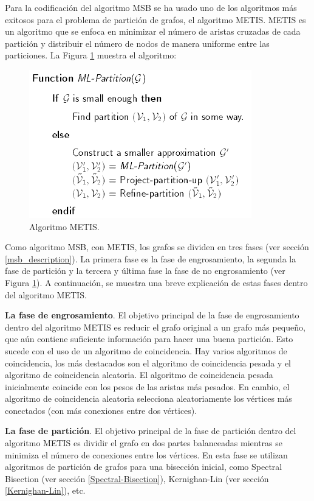 Para la codificación del algoritmo MSB se ha usado uno de los algoritmos más exitosos para el problema de partición de grafos, el algoritmo METIS. METIS\cite{MeTis} es un algoritmo que se enfoca en minimizar el número de aristas cruzadas de cada partición y distribuir el número de nodos de manera uniforme entre las particiones. La Figura \ref{metis} muestra el algoritmo:

\begin{figure}[h]
	\centering
	\includegraphics[scale=0.8]{Figures/metis}
	\vspace{1mm}
	\caption{Algoritmo METIS.}
	\label{metis}
\end{figure}

Como algoritmo MSB, con METIS, los grafos se dividen en tres fases (ver sección \ref{msb_description}). La primera fase es la fase de engrosamiento, la segunda la fase de partición y la tercera y última fase la fase de no engrosamiento (ver Figura \ref{metis}). A continuación, se muestra una breve explicación de estas fases dentro del algoritmo METIS.

\textbf{La fase de engrosamiento}. El objetivo principal de la fase de engrosamiento dentro del algoritmo METIS es reducir el grafo original a un grafo más pequeño, que aún contiene suficiente información para hacer una buena partición. Esto sucede con el uso de un algoritmo de coincidencia. Hay varios algoritmos de coincidencia, los más destacados son el algoritmo de coincidencia pesada y el algoritmo de coincidencia aleatoria. El algoritmo de coincidencia pesada inicialmente coincide con los pesos de las aristas más pesados. En cambio, el algoritmo de coincidencia aleatoria selecciona aleatoriamente los vértices más conectados (con más conexiones entre dos vértices). 

\textbf{La fase de partición}. El objetivo principal de la fase de partición dentro del algoritmo METIS es dividir el grafo en dos partes balanceadas mientras se minimiza el número de conexiones entre los vértices. En esta fase se utilizan algoritmos de partición de grafos para una bisección inicial, como Spectral Bisection (ver sección \ref{Spectral-Bisection}), Kernighan-Lin (ver sección \ref{Kernighan-Lin}), etc.  

